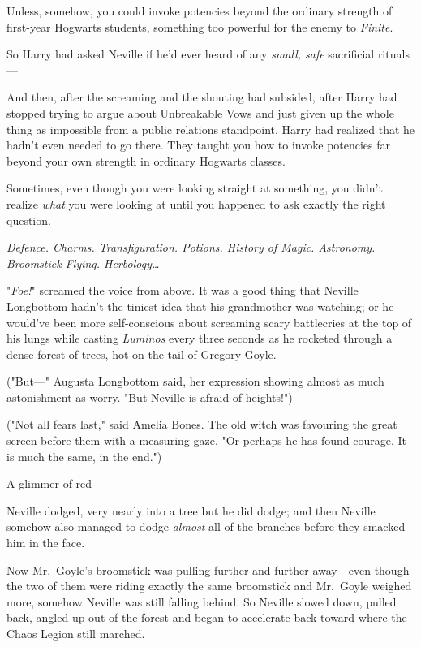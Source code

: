Unless, somehow, you could invoke potencies beyond the ordinary strength of
first-year Hogwarts students, something too powerful for the enemy to
\emph{Finite}.

So Harry had asked Neville if he'd ever heard of any \emph{small, safe}
sacrificial rituals---

And then, after the screaming and the shouting had subsided, after Harry had
stopped trying to argue about Unbreakable Vows and just given up the whole
thing as impossible from a public relations standpoint, Harry had realized that
he hadn't even needed to go there. They taught you how to invoke potencies far
beyond your own strength in ordinary Hogwarts classes.

Sometimes, even though you were looking straight at something, you didn't
realize \emph{what} you were looking at until you happened to ask exactly the
right question.

\emph{Defence. Charms. Transfiguration. Potions. History of Magic. Astronomy.
Broomstick Flying. Herbology{\ldots}}

"\emph{Foe!}" screamed the voice from above.
\later
It was a good thing that Neville Longbottom hadn't the tiniest idea that his
grandmother was watching; or he would've been more self-conscious about
screaming scary battlecries at the top of his lungs while casting
\emph{Luminos} every three seconds as he rocketed through a dense forest of
trees, hot on the tail of Gregory Goyle.

("But---" Augusta Longbottom said, her expression showing almost as much
astonishment as worry. "But Neville is afraid of heights!")

("Not all fears last," said Amelia Bones. The old witch was favouring the great
screen before them with a measuring gaze. "Or perhaps he has found courage. It
is much the same, in the end.")

A glimmer of red---

Neville dodged, very nearly into a tree but he did dodge; and then Neville
somehow also managed to dodge \emph{almost} all of the branches before they
smacked him in the face.

Now Mr.~Goyle's broomstick was pulling further and further away---even though
the two of them were riding exactly the same broomstick and Mr.~Goyle weighed
more, somehow Neville was still falling behind. So Neville slowed down, pulled
back, angled up out of the forest and began to accelerate back toward where the
Chaos Legion still marched.

